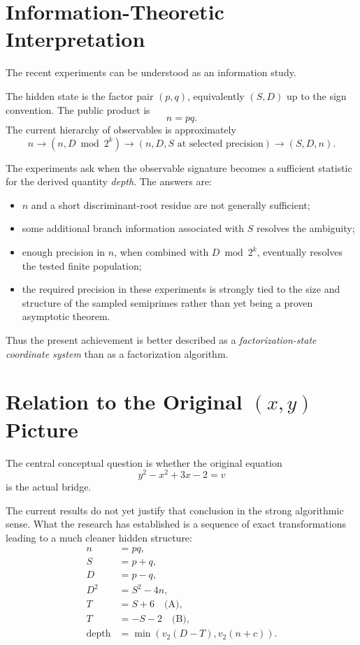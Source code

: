 \documentclass[11pt,a4paper]{article}
\begin{document}
\section{Information-Theoretic Interpretation}

The recent experiments can be understood as an information study.

The hidden state is the factor pair $(p,q)$, equivalently $(S,D)$ up to the sign convention.  The public product is
\[
 n=pq.
\]
The current hierarchy of observables is approximately
\[
 n
\longrightarrow
(n,D\bmod2^k)
\longrightarrow
(n,D,S\text{ at selected precision})
\longrightarrow
(S,D,n).
\]

The experiments ask when the observable signature becomes a sufficient statistic for the derived quantity \emph{depth}.  The answers are:
\begin{itemize}[leftmargin=1.7em]
    \item $n$ and a short discriminant-root residue are not generally sufficient;
    \item some additional branch information associated with $S$ resolves the ambiguity;
    \item enough precision in $n$, when combined with $D\bmod2^k$, eventually resolves the tested finite population;
    \item the required precision in these experiments is strongly tied to the size and structure of the sampled semiprimes rather than yet being a proven asymptotic theorem.
\end{itemize}

Thus the present achievement is better described as a \emph{factorization-state coordinate system} than as a factorization algorithm.

\section{Relation to the Original $(x,y)$ Picture}

The central conceptual question is whether the original equation
\[
 y^2-x^2+3x-2=v
\]
is the actual bridge.

The current results do not yet justify that conclusion in the strong algorithmic sense.  What the research has established is a sequence of exact transformations leading to a much cleaner hidden structure:
\begin{align*}
 n&=pq,\\
 S&=p+q,\\
 D&=p-q,\\
 D^2&=S^2-4n,\\
 T&=S+6\quad\text{(A)},\\
 T&=-S-2\quad\text{(B)},\\
 \operatorname{depth}&=\min(v_2(D-T),v_2(n+c)).
\end{align*}
\end{document}
